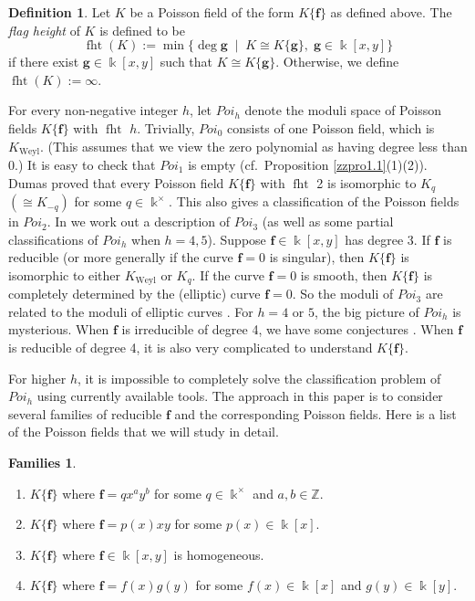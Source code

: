 \documentclass[12pt]{amsart}
\theoremstyle{plain}
\numberwithin{theorem}{section}
\numberwithin{equation}{theorem}
\theoremstyle{definition}
\newtheorem{definition}[theorem]{Definition}
\newtheorem{family}[theorem]{Families}
\newcommand{\ZZ}{\mathbb{Z}}
\DeclareMathOperator{\fht}{fht}
\newcommand \bff {{\mathbf{f}}}
\newcommand \bfg {{\mathbf{g}}}
\DeclareMathOperator{\Weyl}{Weyl}
\newcommand \Kweyl {K_{\Weyl}}
\begin{document}
\begin{definition}
\label{zzdef0.2}
Let $K$ be a Poisson field of the form 
$K\{\bff\}$ as defined above. The {\it 
flag height} of $K$ is defined to be
\begin{equation}
\label{E0.2.1}\tag{E0.2.1}
\fht(K) :=\min\{\deg \bfg \; \mid \; 
K\cong K\{\bfg\},\; \bfg\in \Bbbk[x,y]\}
\end{equation}
if there exist $\bfg\in \Bbbk[x,y]$ such 
that $K\cong K\{\bfg\}$. Otherwise, we 
define $\fht(K) :=\infty$. 
\end{definition}

For every non-negative integer $h$, let 
$Poi_{h}$ denote the moduli space of 
Poisson fields $K\{\bff\}$ with $\fht$ $h$. 
Trivially, $Poi_{0}$ consists of one 
Poisson field, which is $\Kweyl$.  
(This assumes that we view the zero 
polynomial as having degree less than $0$.) 
It is easy to check that $Poi_{1}$ is empty 
(cf.~Proposition \ref{zzpro1.1}(1)(2)). 
Dumas \cite[Proposition, p.12]{Dumas} 
proved that every Poisson field 
$K\{\bff\}$ with $\fht$ 2 is isomorphic 
to $K_{q}$ $(\cong K_{-q})$ for some 
$q\in \Bbbk^{\times}$.  This also gives 
a classification of the Poisson fields 
in $Poi_{2}$. In \cite{GZ2} we work out 
a description of $Poi_{3}$ (as well as 
some partial classifications of $Poi_{h}$ 
when $h=4,5$). Suppose $\bff\in \Bbbk[x,y]$ 
has degree 3. If $\bff$ is reducible (or 
more generally if the curve $\bff=0$ 
is singular), then $K\{\bff\}$ is isomorphic 
to either $\Kweyl$ or $K_q$. If the curve 
$\bff=0$ is smooth, then $K\{\bff\}$ is 
completely determined by the (elliptic) 
curve $\bff=0$. So the moduli of $Poi_{3}$ 
are related to the moduli of elliptic 
curves \cite{GZ2}. For $h=4$ or $5$, the 
big picture of $Poi_{h}$ is mysterious. 
When $\bff$ is irreducible of degree 4, we 
have some conjectures \cite{GZ2}. When 
$\bff$ is reducible of degree 4, it is 
also very complicated to understand 
$K\{\bff\}$.

For higher $h$, it is impossible to 
completely solve the classification problem 
of $Poi_{h}$ using currently available 
tools. The approach in this paper is to 
consider several families of reducible 
$\bff$ and the corresponding Poisson 
fields. Here is a list of the Poisson 
fields that we will study in detail.

\begin{family}
\label{zzfam0.3}
\begin{enumerate}
\item 
$K\{\bff\}$ where $\bff=q x^a y^b$ for 
some $q\in \Bbbk^{\times}$ and $a,b\in {\ZZ}$.
\item 
$K\{\bff\}$ where $\bff=p(x) xy $ for 
some $p(x)\in \Bbbk[x]$.
\item
$K\{\bff\}$ where $\bff\in \Bbbk[x,y]$ is 
homogeneous.
\item 
$K\{\bff\}$ where $\bff = f(x) g(y)$ for 
some $f(x)\in \Bbbk[x]$ and $g(y)\in \Bbbk[y]$.
\end{enumerate}
\end{family}
\end{document}
